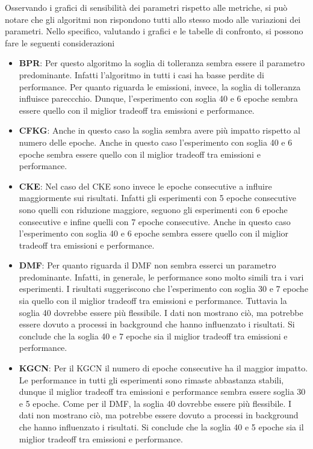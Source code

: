 \noindent Osservando i grafici di sensibilità dei parametri rispetto alle metriche, si può notare che gli algoritmi non rispondono tutti allo stesso modo alle variazioni dei parametri.
Nello specifico, valutando i grafici e le tabelle di confronto, si possono fare le seguenti considerazioni
\begin{itemize}
    \item \textbf{BPR}: Per questo algoritmo la soglia di tolleranza sembra essere il parametro predominante. Infatti l'algoritmo in tutti i casi ha basse perdite di performance. Per quanto riguarda le emissioni, invece, la soglia di tolleranza influisce pareccchio. Dunque, l'esperimento con soglia 40 e 6 epoche sembra essere quello con il miglior tradeoff tra emissioni e performance.
    \item \textbf{CFKG}: Anche in questo caso la soglia sembra avere più impatto rispetto al numero delle epoche. Anche in questo caso l'esperimento con soglia 40 e 6 epoche sembra essere quello con il miglior tradeoff tra emissioni e performance.
    \item \textbf{CKE}: Nel caso del CKE sono invece le epoche consecutive a influire maggiormente sui risultati. Infatti gli esperimenti con 5 epoche consecutive sono quelli con riduzione maggiore, seguono gli esperimenti con 6 epoche consecutive e infine quelli con 7 epoche consecutive. Anche in questo caso l'esperimento con soglia 40 e 6 epoche sembra essere quello con il miglior tradeoff tra emissioni e performance.
    \item \textbf{DMF}: Per quanto riguarda il DMF non sembra esserci un parametro predominante. Infatti, in generale, le performance sono molto simili tra i vari esperimenti. I risultati suggeriscono che l'esperimento con soglia 30 e 7 epoche sia quello con il miglior tradeoff tra emissioni e performance. Tuttavia la soglia 40 dovrebbe essere più flessibile. I dati non mostrano ciò, ma potrebbe essere dovuto a processi in background che hanno influenzato i risultati. Si conclude che la soglia 40 e 7 epoche sia il miglior tradeoff tra emissioni e performance.
    \item \textbf{KGCN}: Per il KGCN il numero di epoche consecutive ha il maggior impatto. Le performance in tutti gli esperimenti sono rimaste abbastanza stabili, dunque il miglior tradeoff tra emissioni e performance sembra essere soglia 30 e 5 epoche. Come per il DMF, la soglia 40 dovrebbe essere più flessibile. I dati non mostrano ciò, ma potrebbe essere dovuto a processi in background che hanno influenzato i risultati. Si conclude che la soglia 40 e 5 epoche sia il miglior tradeoff tra emissioni e performance.

\end{itemize}

